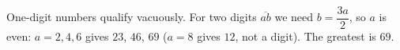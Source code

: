 One-digit numbers qualify vacuously. For two digits $\overline{ab}$ we need $b=\dfrac{3a}2$, so $a$ is even: $a=2,4,6$ gives $23$, $46$, $69$ ($a=8$ gives $12$, not a digit). The greatest is $\boxed{69}$.

